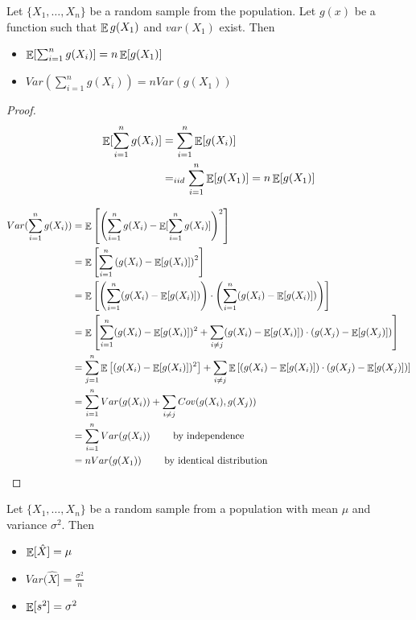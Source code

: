 \documentclass[10pt]{article}
\begin{document}
\begin{theorem}
	Let $\{X_1,\dots,X_n\}$ be a random sample from the population. Let $g(x)$ be a function such that $\mathop{\mathbb{E}} g(X_1)$ and $var(X_1)$ exist. Then
	\begin{itemize}
		\item $\mathop{\mathbb{E}}[ \sum_{i=1}^n g(X_i)] = n \mathop{\mathbb{E}}[g(X_1)] $
		\item $Var( \sum_{i=1}^n g(X_i)) = n Var(g(X_1))$
	\end{itemize}
	\end{theorem}
	\begin{proof}
		\begin{align*}
			\mathop{\mathbb{E}}[ \sum_{i=1}^n g(X_i)] &= \sum_{i=1}^n \mathop{\mathbb{E}}[g(X_i)] \\
			&=_{iid} \sum_{i=1}^n \mathop{\mathbb{E}}[g(X_1)] = n\mathop{\mathbb{E}}[g(X_1)]
		\end{align*}
		
	\begin{align*}
		Var(\sum_{i=1}^n g(X_i)) &= \mathop{\mathbb{E}}\left[ \left(\sum_{i=1}^n g(X_i) - \mathop{\mathbb{E}}[\sum_{i=1}^n g(X_i)]\right)^2 \right] \\
		&= \mathop{\mathbb{E}}\left[ \sum_{i=1}^n\left( g(X_i) - \mathop{\mathbb{E}}[ g(X_i)]\right)^2 \right] \\
		&= \mathop{\mathbb{E}} \left[ \left( \sum_{i=1}^n (g(X_i) - \mathop{\mathbb{E}}[g(X_i)]) \right) \cdot \left( \sum_{i=1}^n (g(X_i) - \mathop{\mathbb{E}}[g(X_i)]) \right) \right] \\
		&= \mathop{\mathbb{E}} \left[ \sum_{i=1}^n (g(X_i) - \mathop{\mathbb{E}}[g(X_i)])^2 + \sum_{i \ne j} (g(X_i) - \mathop{\mathbb{E}}[g(X_i)]) \cdot (g(X_j) - \mathop{\mathbb{E}}[g(X_j)]) \right] \\
		&= \sum_{j=1}^n \mathop{\mathbb{E}}\left[ (g(X_i) - \mathop{\mathbb{E}}[g(X_i)])^2 \right] + \sum_{i \ne j} \mathop{\mathbb{E}}\left[ (g(X_i) - \mathop{\mathbb{E}}[g(X_i)])\cdot(g(X_j) - \mathop{\mathbb{E}}[g(X_j)])  \right] \\
		&= \sum_{i=1}^n Var(g(X_i)) + \sum_{i\ne j} Cov(g(X_i),g(X_j)) \\
		&= \sum_{i=1}^n Var(g(X_i)) \qquad \text{ by independence} \\
		&= n Var(g(X_1)) \qquad \text{ by identical distribution}
	\end{align*}
	\end{proof}

\begin{theorem}
	Let $\{X_1,\dots,X_n\}$ be a random sample from a population with mean $\mu$ and variance $\sigma^2$. Then
	\begin{itemize}
		\item $\mathop{\mathbb{E}}[\hat{X}] = \mu$
		\item $Var(\hat{X}] = \frac{\sigma^2}{n}$
		\item $\mathop{\mathbb{E}}[s^2] = \sigma^2$
	\end{itemize}
\end{theorem}
\end{document}
